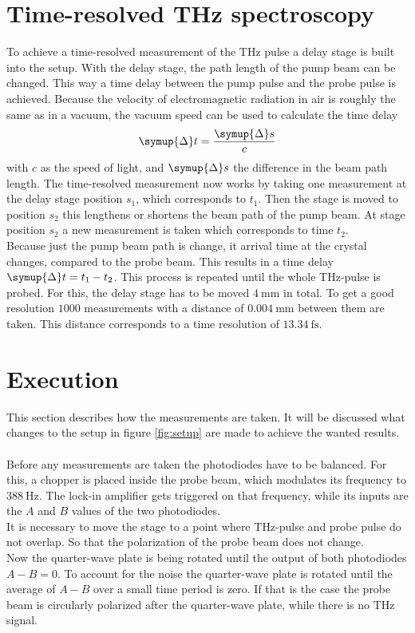 \section{Time-resolved THz spectroscopy}
\label{sec:time_domain}
To achieve a time-resolved measurement of the $\si{\tera\hertz}$ pulse a delay stage is built into the setup.
With the delay stage, the path length of the pump beam can be changed.
This way a time delay between the pump pulse and the probe pulse is achieved.
Because the velocity of electromagnetic radiation in air is roughly the same as in a vacuum, the vacuum speed can be used to calculate the time delay   
\begin{equation}
    \symup{\Delta} t = \frac{\symup{\Delta} s}{c}
\end{equation}
with $c$ as the speed of light, and $\symup{\Delta} s$ the difference in the beam path length.
The time-resolved measurement now works by taking one measurement at the delay stage position $s_1$, which corresponds to $t_1$.
Then the stage is moved to position $s_2$ this lengthens or shortens the beam path of the pump beam.
At stage position $s_2$ a new measurement is taken which corresponds to time $t_2$.
\\
Because just the pump beam path is change, it arrival time at the crystal changes, compared to the probe beam.
This results in a time delay $\symup{\Delta} t = t_1-t_2$.
This process is repeated until the whole $\si{\tera\hertz}$-pulse is probed.
For this, the delay stage has to be moved $\SI{4}{\milli\meter}$ in total.
To get a good resolution $1000$ measurements with a distance of $\SI{0.004}{\milli\meter}$ between them are taken.
This distance corresponds to a time resolution of $\SI{13.34}{\femto\second}$.

\section{Execution}
\label{sec:execution}
This section describes how the measurements are taken. 
It will be discussed what changes to the setup in figure \ref{fig:setup} are made to achieve the wanted results.
\\\\
Before any measurements are taken the photodiodes have to be balanced.
For this, a chopper is placed inside the probe beam, which modulates its frequency to $\SI{388}{\hertz}$.
The lock-in amplifier gets triggered on that frequency, while its inputs are the $A$ and $B$ values of the two photodiodes.
\\
It is necessary to move the stage to a point where $\si{\tera\hertz}$-pulse and probe pulse do not overlap.
So that the polarization of the probe beam does not change.
\\
Now the quarter-wave plate is being rotated until the output of both photodiodes $A-B = 0$.
To account for the noise the quarter-wave plate is rotated until the average of $A-B$ over a small time period is zero.
If that is the case the probe beam is circularly polarized after the quarter-wave plate, while there is no $\si{\tera\hertz}$ signal.
